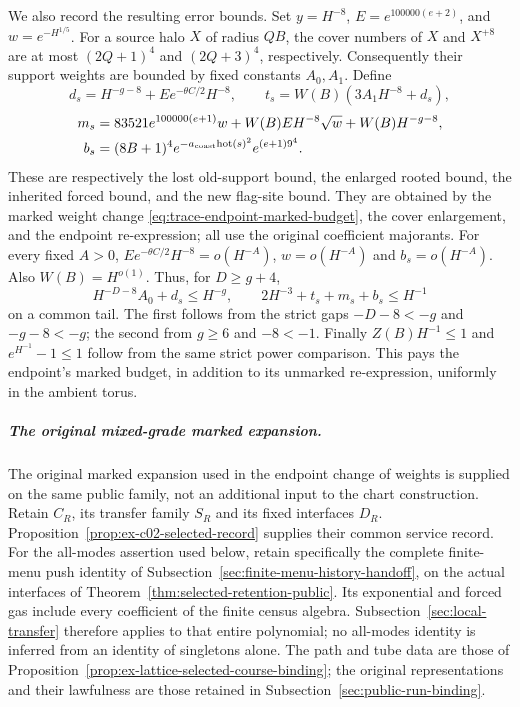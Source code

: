 We also record the resulting error bounds. Set $y=H^{-8}$,
$E=e^{100000(e+2)}$, and $w=e^{-H^{1/5}}$. For a source halo
$X$ of radius $QB$, the cover numbers of $X$ and $X^{+8}$ are at
most $(2Q+1)^4$ and $(2Q+3)^4$, respectively. Consequently their
support weights are bounded by fixed constants $A_0,A_1$. Define
\[
 d_s=H^{-g-8}+Ee^{-\theta C/2}H^{-8},\qquad
 t_s=W(B)(3A_1H^{-8}+d_s),
\]
\begin{align*}
 m_s&=83521e^{100000(e+1)}w
       +W(B)EH^{-8}\sqrt w+W(B)H^{-g-8},\\
 b_s&=(8B+1)^4e^{-a_{\rm coast}\mathrm{hot}(s)^2}
                        e^{(e+1)9^4}.
\end{align*}
These are respectively the lost old-support bound, the enlarged
rooted bound, the inherited forced bound, and the new flag-site
bound. They are obtained by the marked weight change
\eqref{eq:trace-endpoint-marked-budget}, the cover enlargement, and
the endpoint re-expression; all use the original coefficient
majorants. For every fixed $A>0$,
$Ee^{-\theta C/2}H^{-8}=o(H^{-A})$,
$w=o(H^{-A})$ and $b_s=o(H^{-A})$.
Also $W(B)=H^{o(1)}$. Thus, for $D\ge g+4$,
\[
 H^{-D-8}A_0+d_s\le H^{-g},\qquad
 2H^{-3}+t_s+m_s+b_s\le H^{-1}
\]
on a common tail. The first follows from the strict gaps
$-D-8<-g$ and $-g-8<-g$; the second from $g\ge6$ and
$-8<-1$. Finally $Z(B)H^{-1}\le1$ and
$e^{H^{-1}}-1\le1$ follow from the same strict power comparison.
This pays the endpoint's marked budget, in addition to its
unmarked re-expression, uniformly in the ambient torus.

\subparagraph{The original mixed-grade marked expansion.}
The original marked expansion used in the endpoint change of weights
is supplied on the same public family, not an additional input to the
chart construction. Retain $C_R$, its transfer family $S_R$ and its
fixed interfaces $D_R$. Proposition~\ref{prop:ex-c02-selected-record}
supplies their common service record. For the all-modes assertion used
below, retain specifically the complete finite-menu push identity of
Subsection~\ref{sec:finite-menu-history-handoff}, on the actual interfaces
of Theorem~\ref{thm:selected-retention-public}. Its exponential and
forced gas include every coefficient of the finite census algebra.
Subsection~\ref{sec:local-transfer} therefore applies to that entire
polynomial; no all-modes identity is inferred from an identity of
singletons alone. The path and tube data are those
of Proposition~\ref{prop:ex-lattice-selected-course-binding}; the
original representations and their lawfulness are those retained in
Subsection~\ref{sec:public-run-binding}.

